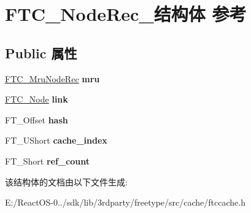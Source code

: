\hypertarget{struct_f_t_c___node_rec__}{}\section{F\+T\+C\+\_\+\+Node\+Rec\+\_\+结构体 参考}
\label{struct_f_t_c___node_rec__}
\subsection*{Public 属性}
\begin{DoxyCompactItemize}
\item 
\mbox{\label{struct_f_t_c___node_rec___a7f9932dc47974390275594671ac70493}} 
\hyperlink{struct_f_t_c___mru_node_rec__}{F\+T\+C\+\_\+\+Mru\+Node\+Rec} {\bfseries mru}
\item 
\mbox{\label{struct_f_t_c___node_rec___a90db883e43107186580ebb85e46e9af2}} 
\hyperlink{struct_f_t_c___node_rec__}{F\+T\+C\+\_\+\+Node} {\bfseries link}
\item 
\mbox{\label{struct_f_t_c___node_rec___a39bd25efa6b88e8652abdc57e7b5a5e9}} 
F\+T\+\_\+\+Offset {\bfseries hash}
\item 
\mbox{\label{struct_f_t_c___node_rec___afff5b09105bf92c284ba9e91fd00ad8e}} 
F\+T\+\_\+\+U\+Short {\bfseries cache\+\_\+index}
\item 
\mbox{\label{struct_f_t_c___node_rec___a30ba3878a09ce276f9d804ed9451cdcb}} 
F\+T\+\_\+\+Short {\bfseries ref\+\_\+count}
\end{DoxyCompactItemize}


该结构体的文档由以下文件生成\+:\begin{DoxyCompactItemize}
\item 
E\+:/\+React\+O\+S-\/0../sdk/lib/3rdparty/freetype/src/cache/ftccache.\+h\end{DoxyCompactItemize}
